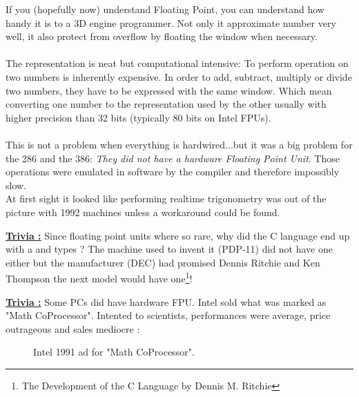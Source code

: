\documentclass[book.tex]{subfiles}
\begin{document}
If you (hopefully now) understand Floating Point, you can understand how handy it is to a 3D engine programmer.
Not only it approximate number very well, it also protect from overflow by floating the window when necessary.\\
\\
The representation is neat but computational intensive: To perform operation on two numbers is inherently expensive. In order to add, subtract, multiply or divide two numbers, they have to be expressed with the same window. Which mean converting one number to the representation used by the other usually with higher precision than 32 bits (typically 80 bits on Intel FPUs).\\
\\
This is not a problem when everything is hardwired...but it was a big problem for the 286 and the 386: \emph{They did not have a hardware Floating Point Unit}. Those operations were emulated in software by the compiler and therefore impossibly slow.\\
\bigskip
At first sight it looked like performing realtime trigonometry was out of the picture with 1992 machines unless a workaround could be found.

  \bigskip

 \textbf{\underline{Trivia :}} Since floating point units where so rare, why did the C language end up with a  and  types ? The machine used to invent it (PDP-11) did not have one either but the manufacturer (DEC) had promised Dennis Ritchie and Ken Thompson the next model would have one\footnote{The Development of the C Language by Dennis M. Ritchie}!

\bigskip  
\break
\textbf{\underline{Trivia :}} Some PCs did have hardware FPU. Intel sold what was marked as "Math CoProcessor". Intented to scientists, performances were average, price outrageous and sales mediocre :\\
\begin{figure}[H]
\centering
\caption{Intel 1991 ad for "Math CoProcessor".}
\label{fig:fp_internals}
\end{figure}
\end{document}
